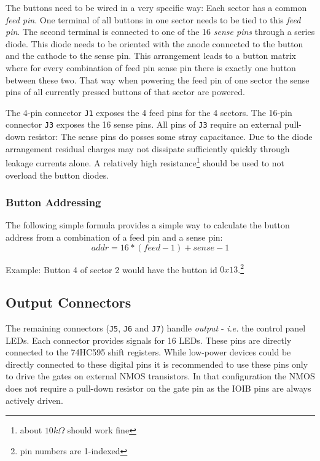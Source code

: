 \documentclass{scrreprt}
\begin{document}
The buttons need to be wired in a very specific way:
Each sector has a common \emph{feed pin}.
One terminal of all buttons in one sector needs to be tied to this \emph{feed pin}.
The second terminal is connected to one of the 16 \emph{sense pins} through a series diode.
This diode needs to be oriented with the anode connected to the button and the cathode to the sense pin.
This arrangement leads to a button matrix where for every combination of feed pin sense pin there is exactly one button between these two.
That way when powering the feed pin of one sector the sense pins of all currently pressed buttons of that sector are powered.

The 4-pin connector \texttt{J1} exposes the 4 feed pins for the 4 sectors.
The 16-pin connector \texttt{J3} exposes the 16 sense pins.
All pins of \texttt{J3} require an external pull-down resistor:
The sense pins do posses some stray capacitance.
Due to the diode arrangement residual charges may not dissipate sufficiently quickly through leakage currents alone.
A relatively high resistance\footnote{about $10k\Omega$ should work fine} should be used to not overload the button diodes.

\subsubsection{Button Addressing}
The following simple formula provides a simple way to calculate the button address from a combination of a feed pin and a sense pin:
\[addr = 16 * (feed - 1) + sense - 1\]

Example:
Button 4 of sector 2 would have the button id $0x13$.\footnote{pin numbers are 1-indexed}

\subsection{Output Connectors}
The remaining connectors (\texttt{J5}, \texttt{J6} and \texttt{J7}) handle \emph{output} - \emph{i.e.} the control panel LEDs.
Each connector provides signals for 16 LEDs.
These pins are directly connected to the 74HC595 shift registers.
While low-power devices could be directly connected to these digital pins it is recommended to use these pins only to drive the gates on external NMOS transistors.
In that configuration the NMOS does not require a pull-down resistor on the gate pin as the IOIB pins are always actively driven.
\end{document}
